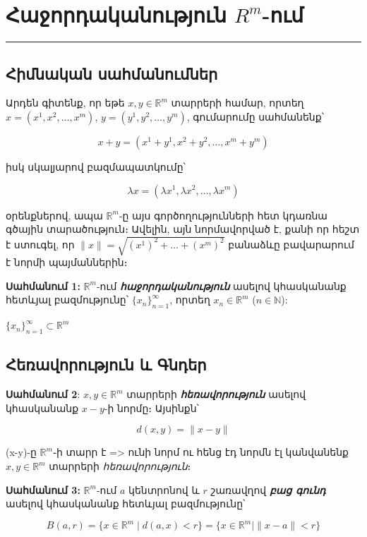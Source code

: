\documentclass[12pt, a4paper]{article}
\begin{document}
\section{Հաջորդականություն $R^m$-ում}

\tableofcontents

\vspace{2em}
\hrule
\vspace{2em}

\subsection{Հիմնական սահմանումներ}

Արդեն գիտենք, որ եթե $x, y \in \mathbb{R}^m$ տարրերի համար, որտեղ $x=(x^1, x^2, \dots, x^m)$, $y=(y^1, y^2, \dots, y^m)$, գումարումը սահմանենք՝

$$
x+y = (x^1+y^1, x^2+y^2, \dots, x^m+y^m)
$$

իսկ սկալյարով բազմապատկումը՝

$$
\lambda x = (\lambda x^1, \lambda x^2, \dots, \lambda x^m)
$$

օրենքներով, ապա $\mathbb{R}^m$-ը այս գործողությունների հետ կդառնա գծային տարածություն։ Ավելին, այն նորմավորված է, քանի որ հեշտ է ստուգել, որ $\|x\| = \sqrt{(x^1)^2 + \dots + (x^m)^2}$ բանաձևը բավարարում է նորմի պայմաններին։

\textbf{Սահմանում 1:} $\mathbb{R}^m$-ում \textbf{\textit{հաջորդականություն}} ասելով կհասկանանք հետևյալ բազմությունը՝ $\{x_n\}_{n=1}^\infty$, որտեղ $x_n \in \mathbb{R}^m$ ($n \in \mathbb{N}$):

$\{x_n\}_{n=1}^\infty \subset \mathbb{R}^m$

\subsection{Հեռավորություն և Գնդեր}

\textbf{Սահմանում 2}: $x, y \in \mathbb{R}^m$ տարրերի \textbf{\textit{հեռավորություն}} ասելով կհասկանանք $x-y$-ի նորմը։ Այսինքն՝

$$
d(x, y) = \|x - y\|
$$

(x-y)-ը $\mathbb{R}^m$֊ի տարր է => ունի նորմ ու հենց էդ նորմն էլ կանվանենք $x, y \in \mathbb{R}^m$ տարրերի \textit{հեռավորություն}։ 

\textbf{Սահմանում 3:} $\mathbb{R}^m$-ում $a$ կենտրոնով և $r$ շառավղով \textbf{\textit{բաց գունդ}} ասելով կհասկանանք հետևյալ բազմությունը՝

$$
B(a, r) = \{x \in \mathbb{R}^m \mid d(a, x) < r\} = \{x \in \mathbb{R}^m \mid \|x - a\| < r\}
$$
\end{document}
